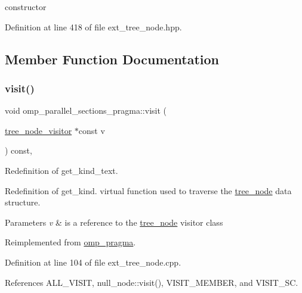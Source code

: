 constructor 



Definition at line 418 of file ext\+\_\+tree\+\_\+node.\+hpp.



\subsection{Member Function Documentation}
\mbox{\label{structomp__parallel__sections__pragma_a8f7f1c69bd6c94e4fbe53daf45bb33a7}} 
\subsubsection{\texorpdfstring{visit()}{visit()}}
{\footnotesize\ttfamily void omp\+\_\+parallel\+\_\+sections\+\_\+pragma\+::visit (\begin{DoxyParamCaption}\item[{\hyperlink{classtree__node__visitor}{tree\+\_\+node\+\_\+visitor} $\ast$const}]{v }\end{DoxyParamCaption}) const\hspace{0.3cm}{\ttfamily [override]}, {\ttfamily [virtual]}}



Redefinition of get\+\_\+kind\+\_\+text. 

Redefinition of get\+\_\+kind. virtual function used to traverse the \hyperlink{classtree__node}{tree\+\_\+node} data structure. 
\begin{DoxyParams}{Parameters}
{\em v} & is a reference to the \hyperlink{classtree__node}{tree\+\_\+node} visitor class \\
\hline
\end{DoxyParams}


Reimplemented from \hyperlink{structomp__pragma_a2e2c445528b7e097ae76fa618a9970b5}{omp\+\_\+pragma}.



Definition at line 104 of file ext\+\_\+tree\+\_\+node.\+cpp.



References A\+L\+L\+\_\+\+V\+I\+S\+IT, null\+\_\+node\+::visit(), V\+I\+S\+I\+T\+\_\+\+M\+E\+M\+B\+ER, and V\+I\+S\+I\+T\+\_\+\+SC.

